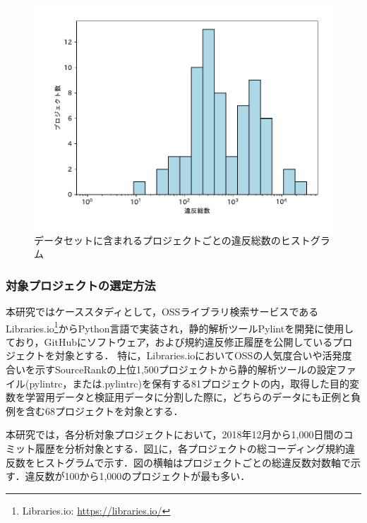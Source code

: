\documentclass[submit,noauthor,ses,dvipdfmx]{ipsj}
\begin{document}
\begin{figure}[t]
	\centering
	\includegraphics[width=1\linewidth]{Kameoka_fig/dataset_hist.pdf}
	\caption{データセットに含まれるプロジェクトごとの違反総数のヒストグラム}
	\label{fig:dataset}
\end{figure}

\subsubsection{対象プロジェクトの選定方法}
本研究ではケーススタディとして，OSSライブラリ検索サービスであるLibraries.io\footnote{Libraries.io: \url{https://libraries.io/}}からPython言語で実装され，静的解析ツールPylintを開発に使用しており，GitHubにソフトウェア，および規約違反修正履歴を公開しているプロジェクトを対象とする．
特に，Libraries.ioにおいてOSSの人気度合いや活発度合いを示すSourceRankの上位1,500プロジェクトから静的解析ツールの設定ファイル(pylintrc，または.pylintrc)を保有する81プロジェクトの内，取得した目的変数を学習用データと検証用データに分割した際に，どちらのデータにも正例と負例を含む68プロジェクトを対象とする．

本研究では，各分析対象プロジェクトにおいて，2018年12月から1,000日間のコミット履歴を分析対象とする．図\ref{fig:dataset}に，各プロジェクトの総コーディング規約違反数をヒストグラムで示す．図の横軸はプロジェクトごとの総違反数対数軸で示す．違反数が100から1,000のプロジェクトが最も多い．

\end{document}
